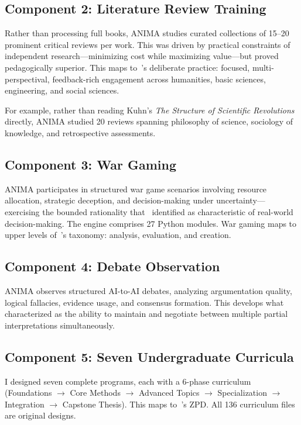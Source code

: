 \documentclass[11pt,a4paper]{article}
\begin{document}
\subsection{Component 2: Literature Review Training}
Rather than processing full books, ANIMA studies curated collections of 15--20 prominent critical reviews per work. This was driven by practical constraints of independent research---minimizing cost while maximizing value---but proved pedagogically superior. This maps to~\citeauthor{ericsson1993role}'s deliberate practice: focused, multi-perspectival, feedback-rich engagement across humanities, basic sciences, engineering, and social sciences.

For example, rather than reading Kuhn's \emph{The Structure of Scientific Revolutions}~\citep{kuhn1962structure} directly, ANIMA studied 20 reviews spanning philosophy of science, sociology of knowledge, and retrospective assessments.

\subsection{Component 3: War Gaming}
ANIMA participates in structured war game scenarios involving resource allocation, strategic deception, and decision-making under uncertainty---exercising the bounded rationality that~\citet{simon1955behavioral} identified as characteristic of real-world decision-making. The engine comprises 27 Python modules. War gaming maps to upper levels of~\citeauthor{bloom1956taxonomy}'s taxonomy: analysis, evaluation, and creation.

\subsection{Component 4: Debate Observation}
ANIMA observes structured AI-to-AI debates, analyzing argumentation quality, logical fallacies, evidence usage, and consensus formation. This develops what~\citet{minsky1986society} characterized as the ability to maintain and negotiate between multiple partial interpretations simultaneously.

\subsection{Component 5: Seven Undergraduate Curricula}
I designed seven complete programs, each with a 6-phase curriculum (Foundations $\to$ Core Methods $\to$ Advanced Topics $\to$ Specialization $\to$ Integration $\to$ Capstone Thesis). This maps to~\citeauthor{vygotsky1978mind}'s ZPD. All 136 curriculum files are original designs.
\end{document}
